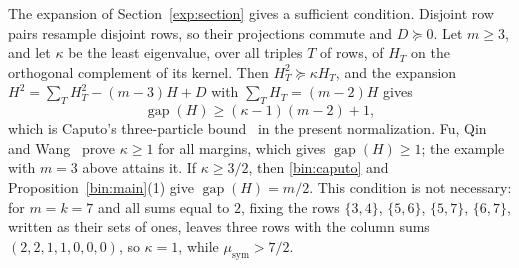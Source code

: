 The expansion of Section~\ref{exp:section} gives a sufficient condition.
Disjoint row pairs resample disjoint rows, so their projections commute and
$D\succeq0$. Let $m\ge3$, and let $\kappa$ be the least eigenvalue, over all triples $T$
of rows, of $H_T$ on the orthogonal complement of its kernel. Then
$H_T^2\succeq\kappa H_T$, and the expansion
$H^2=\sum_TH_T^2-(m-3)H+D$ with $\sum_TH_T=(m-2)H$ gives
\begin{equation}\label{bin:caputo}
 \operatorname{gap}(H)\ge(\kappa-1)(m-2)+1 ,
\end{equation}
which is Caputo's three-particle bound~\cite[Theorem~3.1]{Caputo08} in the
present normalization. Fu, Qin and Wang~\cite[Theorem~5.1]{FQW26} prove
$\kappa\ge1$ for all margins, which gives $\operatorname{gap}(H)\ge1$; the
example with $m=3$ above attains it. If $\kappa\ge3/2$, then
\eqref{bin:caputo} and Proposition~\ref{bin:main}(1) give
$\operatorname{gap}(H)=m/2$. This condition is not necessary: for $m=k=7$
and all sums equal to $2$, fixing the rows $\{3,4\}$, $\{5,6\}$, $\{5,7\}$,
$\{6,7\}$, written as their sets of ones, leaves three rows with the column
sums $(2,2,1,1,0,0,0)$, so $\kappa=1$, while $\mu_{\mathrm{sym}}>7/2$.
